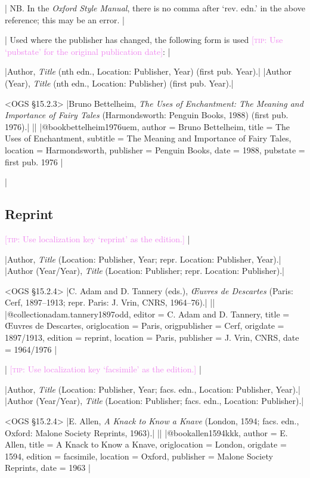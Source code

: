 \documentclass[extrafontsizes,11pt,a4paper,oneside]{memoir}
\newcommand*{\lit}[1]{\textsf{#1}}
\newcommand*{\code}[1]{`\textsf{#1}'}
\newcommand*{\aside}[1]{\textcolor{violet}{[\textsc{tip:} #1]}}
\begin{document}
\todoc[oxnotes]|
NB. In the \emph{Oxford Style Manual}, there is no comma after ‘rev. edn.’ in the above reference; this may be an error.
|

\todoc|
Used where the publisher has changed, the following form is used \aside{Use \code{pubstate} for the original publication date}:
|

\specs
|Author, \emph{Title} (nth \lit{edn.}, Location: Publisher, Year) (\lit{first pub.} Year).|%
|Author (Year), \emph{Title} (nth \lit{edn.}, Location: Publisher) (\lit{first pub.} Year).|

\bibexample<OGS \S15.2.3>
|Bruno Bettelheim, \emph{The Uses of Enchantment: The Meaning and Importance of Fairy Tales} (Harmondsworth: Penguin Books, 1988) (first pub. 1976).|%
||%
|@book{bettelheim1976uem,
  author = {Bruno Bettelheim},
  title = {The Uses of Enchantment},
  subtitle = {The Meaning and Importance of Fairy Tales},
  location = {Harmondsworth},
  publisher = {Penguin Books},
  date = {1988},
  pubstate = {first pub\adddotspace 1976}
}|
  
\todoc|
\subsection{Reprint}

\aside{Use localization key \code{reprint} as the edition.}
|

\specs
|Author, \emph{Title} (Location: Publisher, Year; \lit{repr.} Location: Publisher, Year).|%
|Author (Year/Year), \emph{Title} (Location: Publisher; \lit{repr.} Location: Publisher).|

\bibexample<OGS \S15.2.4>
|C. Adam and D. Tannery (eds.), \emph{Œuvres de Descartes} (Paris: Cerf, 1897--1913; repr. Paris: J. Vrin, CNRS, 1964--76).|%
||%
|@collection{adam.tannery1897odd,
  editor = {C. Adam and D. Tannery},
  title = {Œuvres de Descartes},
  origlocation = {Paris},
  origpublisher = {Cerf},
  origdate = {1897/1913},
  edition = {reprint},
  location = {Paris},
  publisher = {J. Vrin, CNRS},
  date = {1964/1976}
}|

\todoc|
\aside{Use localization key \code{facsimile} as the edition.}
|

\specs
|Author, \emph{Title} (Location: Publisher, Year; \lit{facs. edn.}, Location: Publisher, Year).|%
|Author (Year/Year), \emph{Title} (Location: Publisher; \lit{facs. edn.}, Location: Publisher).|

\bibexample<OGS \S15.2.4>
|E. Allen, \emph{A Knack to Know a Knave} (London, 1594; facs. edn., Oxford: Malone Society Reprints, 1963).|%
||%
|@book{allen1594kkk,
  author = {E. Allen},
  title = {A Knack to Know a Knave},
  origlocation = {London},
  origdate = {1594},
  edition = {facsimile},
  location = {Oxford},
  publisher = {Malone Society Reprints},
  date = {1963}
}|
\end{document}
